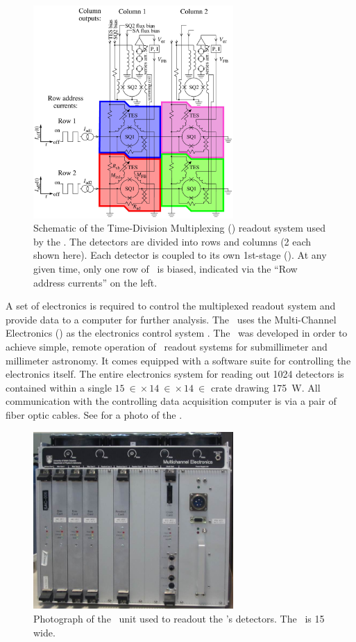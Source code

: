 \begin{figure}
\centering
\includegraphics[width=3in]{images/ch4-tdm-schematic.png}
\caption[Time-Division Multiplexing Schematic]{
  Schematic of the Time-Division Multiplexing (\TDM) readout system used by the \Imager.
  The detectors are divided into rows and columns (2 each shown here).
  Each detector is coupled to its own 1st-stage \SQUID ().
  At any given time, only one row of \SQUIDs\ is biased, indicated via the ``Row address currents'' on the left.
}
\label{fig:ch4-tdm-schematic}
\end{figure}

A set of electronics is required to control the multiplexed readout system and provide data to a computer for further analysis.
The \Imager\ uses the Multi-Channel Electronics (\MCE) as the electronics control system \cite{battistelli_functional_2008,battistelli_automated_2008,_mcewiki_2014}.
The \MCE\ was developed in order to achieve simple, remote operation of \TDM\ readout systems for submillimeter and millimeter astronomy.
It comes equipped with a software suite for controlling the electronics itself.
The entire electronics system for reading out 1024 detectors is contained within a single $\SI{15}{\in} \times \SI{14}{\in} \times \SI{14}{\in}$ crate drawing \SI{175}{\W}.
All communication with the controlling data acquisition computer is via a pair of fiber optic cables.
See  for a photo of the \MCE.

\begin{figure}
\centering
\includegraphics[width=3in]{images/ch4-mce.jpg}
\caption[Photograph of the \MCE]{
  Photograph of the \MCE\ unit used to readout the \Imager's detectors.
  The \MCE\ is \SI{15}{\in} wide.
}
\label{fig:ch4-mce-photo}
\end{figure}

